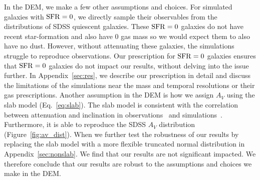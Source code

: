 In the DEM, we make a few other assumptions and choices. For simulated galaxies
with ${\rm SFR}=0$, we directly sample their observables from the distributions of 
SDSS quiescent galaxies. These ${\rm SFR}=0$ galaxies do not have recent
star-formation and also have 0 gas mass so we would expect them to also have no dust. However, without
attenuating these galaxies, the simulations struggle to reproduce observations.
Our prescription for ${\rm SFR} = 0$ galaxies ensures that ${\rm SFR}=0$ galaxies do not
impact our results, without delving into the issue further. In
Appendix~\ref{sec:res}, we describe our prescription in detail and discuss the
limitations of the simulations near the mass and temporal resolutions or their
gas prescriptions. Another assumption in the DEM is how we assign $A_V$ using 
the slab model (Eq.~\ref{eq:slab}). The slab model is consistent with the
correlation between attenuation and inclination in
observations~\citep{conroy2010b, wild2011, battisti2017, salim2020} and
simulations~\citep[\eg][]{chevallard2013, narayanan2018, trayford2020}.
Furthermore, it is able to reproduce the SDSS $A_V$ distribution
(Figure~\ref{fig:av_dist}). When we further test the robustness of our results
by replacing the slab model with a more flexible truncated normal distribution 
in Appendix~\ref{sec:nonslab}. We find that our results are not significant
impacted. We therefore conclude that our results are robust to the assumptions and choices we make in the DEM. 




